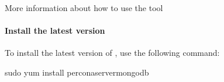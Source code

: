 \documentclass[letterpaper,10pt,english]{sphinxmanual}
\begin{document}
\nopagebreak

\begin{description}
\item[{More information about how to use the  tool}] \leavevmode
\sphinxAtStartPar
{}

\end{description}




\paragraph{Install the latest version}
\label{\detokenize{install/yum:install-the-latest-version}}
\sphinxAtStartPar
To install the latest version of , use the following command:

\begin{sphinxVerbatim}[commandchars=\\\{\}]
\PYGZdl{} sudo yum install percona\PYGZhy{}server\PYGZhy{}mongodb
\end{sphinxVerbatim}
\end{document}
